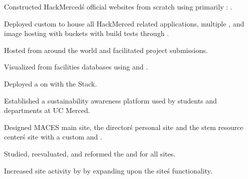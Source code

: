 \documentclass{article}%
\begin{document}
\begin{minipage}{0.55\textwidth}
\begin{tightemize}
\item Constructed HackMerced\'s official websites from scratch using primarily : .%
\item Deployed custom  to house all HackMerced related applications, multiple , and image hosting with  buckets with build tests through .%
\item Hosted  from around the world and facilitated  project submissions.%
\end{tightemize}%
%
%
%
\begin{tightemize}%
\item Visualized  from facilities databases using  and .%
\item Deployed a  on  with the  Stack.%
\item Established a sustainability awareness platform used by  students and  departments at UC Merced.%
\end{tightemize}%
%
%
%
\begin{tightemize}%
\item Designed MACES main site, the director\'s personal site and the stem resource center\'s site with a custom  and .%
\item Studied, reevaluated, and reformed the  and  for all sites.%
\item Increased site activity by  by expanding upon the site\'s functionality.%
\end{tightemize}

%
\end{minipage}%
\hspace{0.2cm}%
\end{document}

